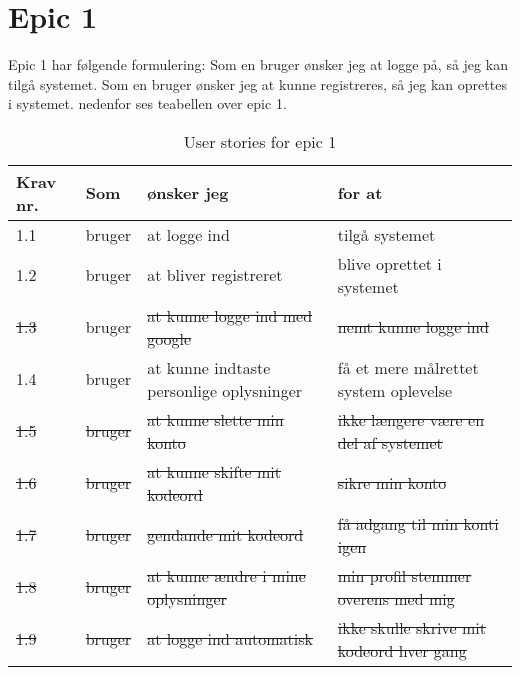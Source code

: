 \section{Epic 1}
Epic 1 har følgende formulering: 
Som en bruger ønsker jeg at logge på, så jeg kan tilgå systemet.
Som en bruger ønsker jeg at kunne registreres, så jeg kan oprettes i systemet.
nedenfor ses teabellen over epic 1.

\begin{table}[H]
    \centering
    \caption{User stories for epic 1}
    \label{tab:us-epic1}
    \begin{tabular}{p{1cm}|p{2cm}|p{6cm}|p{6cm}}
        \textbf{Krav nr.} & \textbf{Som} & \textbf{ønsker jeg}                      & \textbf{for at}                          \\
        \hline
        1.1               & bruger       & at logge ind                             & tilgå systemet                           \\
        \hline
        1.2               & bruger       & at bliver registreret                    & blive oprettet i systemet                \\
        \hline
        \sout{1.3}               & bruger       & \sout{at kunne logge ind med google}            & \sout{nemt kunne logge ind}        \\
        \hline
        1.4               & bruger       & at kunne indtaste personlige oplysninger & få et mere målrettet system oplevelse    \\
		\hline
     	\sout{1.5}        & \sout{bruger}       & \sout{at kunne slette min konto}  & \sout{ikke længere være en del af systemet}  \\ 
        \hline
		\sout{1.6}        & \sout{bruger}        & \sout{at kunne skifte mit kodeord}              & \sout{sikre min konto}           \\
        \hline
        \sout{1.7}        & \sout{bruger}        & \sout{gendande mit kodeord}                     & \sout{få adgang til min konti igen}             \\
        \hline
        \sout{1.8}        & \sout{bruger}        & \sout{at kunne ændre i mine oplysninger}        & \sout{min profil stemmer overens med mig}       \\
        \hline
        \sout{1.9}        & \sout{bruger}        & \sout{at logge ind automatisk}           & \sout{ikke skulle skrive mit kodeord hver gang} \\
    \end{tabular}
\end{table}

